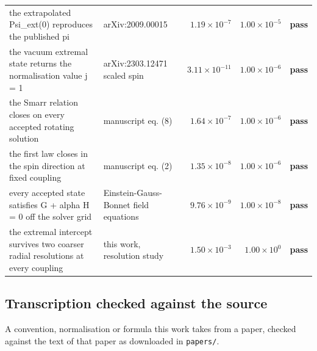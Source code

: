 \documentclass[11pt,a4paper]{article}
\newcommand{\PASS}{\textcolor{pass}{\textbf{pass}}}
\begin{document}
\begin{longtable}{@{}L{.38\textwidth}L{.24\textwidth}rrc@{}}
the extrapolated Psi\_ext(0) reproduces the published pi & arXiv:2009.00015 & $1.19\times10^{-7}$ & $1.00\times10^{-5}$ & \PASS \\
the vacuum extremal state returns the normalisation value j = 1 & arXiv:2303.12471 scaled spin & $3.11\times10^{-11}$ & $1.00\times10^{-6}$ & \PASS \\
the Smarr relation closes on every accepted rotating solution & manuscript eq. (8) & $1.64\times10^{-7}$ & $1.00\times10^{-6}$ & \PASS \\
the first law closes in the spin direction at fixed coupling & manuscript eq. (2) & $1.35\times10^{-8}$ & $1.00\times10^{-6}$ & \PASS \\
every accepted state satisfies G + alpha H = 0 off the solver grid & Einstein-Gauss-Bonnet field equations & $9.76\times10^{-9}$ & $1.00\times10^{-8}$ & \PASS \\
the extremal intercept survives two coarser radial resolutions at every coupling & this work, resolution study & $1.50\times10^{-3}$ & $1.00\times10^{0}$ & \PASS \\
\bottomrule
\end{longtable}

\subsection*{Transcription checked against the source}
A convention, normalisation or formula this work takes from a paper, checked against the text of that paper as downloaded in \texttt{papers/}.
\end{document}
